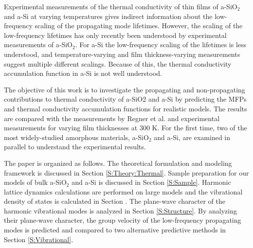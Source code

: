 \documentclass[aps,prb,onecolumn,preprint,superscriptaddress,footinbib,amsmath,amssymb,floatfix]{revtex4}
\begin{document}
Experimental measurements of the thermal conductivity of
thin films of a-SiO$_2$ and a-Si at varying temperatures 
gives indirect information about the low-frequency scaling 
of the propagating mode lifetimes.
\cite{freeman_thermal_1986,graebner_phonon_1986,
love_estimate_1990,feldman_thermal_1993,cahill_thermal_1994,
feldman_numerical_1999,zink_thermal_2006,baldi_thermal_2008,
liu_high_2009,yang_anomalously_2010,hondongwa_ultrasonic_2011} 
However, the scaling of the low-frequency lifetimes 
has only recently been understood by experimental 
measurements of a-SiO$_2$.
\cite{masciovecchio_evidence_2006,baldi_thermal_2008,
baldi_sound_2010,baldi_elastic_2011,baldi_emergence_2013} 
For a-Si the low-frequency scaling of the lifetimes  
is less understood,
\cite{feldman_thermal_1993,cahill_thermal_1994,
feldman_numerical_1999,zink_thermal_2006,liu_high_2009,
yang_anomalously_2010,he_heat_2011,hondongwa_ultrasonic_2011} 
and temperature-varying\cite{zink_thermal_2006} 
and film thickness-varying measurements
\cite{pompe_thermal_1988,cahill_thermal_1989,hasselman_thermal_1989,
kuo_thermal_1992,feldman_thermal_1993,cahill_thermal_1994,
wada_thermal_1996,feldman_numerical_1999,
moon_thermal_2002,zink_thermal_2006,zink_excess_2006,liu_high_2009,
yang_anomalously_2010}
suggest multiple different scalings.  
Because of this, the thermal conductivity accumulation 
function in a-Si is not well understood.
\cite{feldman_thermal_1993,cahill_thermal_1994,
feldman_numerical_1999,liu_high_2009,yang_anomalously_2010,
he_heat_2011,regner_broadband_2013}

The objective of this work is to investigate the propagating 
and non-propagating contributions to thermal conductivity of 
a-SiO2 and a-Si   
by predicting the MFPs and thermal conductivity 
accumulation functions for realistic models. The results are 
compared with the measurements by Regner et al.
\cite{regner_broadband_2013} and experimental measurements 
for varying film thicknesses at 300 K.
\cite{freeman_thermal_1986,graebner_phonon_1986,
cahill_lattice_1988,cahill_thermal_1989,
love_estimate_1990,cahill_thermal_1994,lee_heat_1997,
yamane_measurement_2002,baldi_thermal_2008,
liu_high_2009,yang_anomalously_2010} For the first time, 
two of the most widely-studied amorphous materials, 
a-SiO$_2$ and a-Si, are examined in parallel to understand 
the experimental results. 

The paper is organized as follows. 
The theoretical formulation and modeling framework is 
discussed in Section \ref{S:Theory:Thermal}. Sample preparation 
for our models of bulk a-SiO$_2$ and a-Si is discussed in 
Section \ref{S:Sample}. Harmonic lattice dynamics calculations 
are performed on large models and the vibrational density of states 
is calculated in Section . The plane-wave character of the 
harmonic vibrational modes is analyzed in Section 
\ref{S:Structure}. 
By analyzing their plane-wave character, the group velocity of 
the low-frequency propagating modes is predicted and 
compared to two alternative predictive methods in Section 
\ref{S:Vibrational}. 
\end{document}

